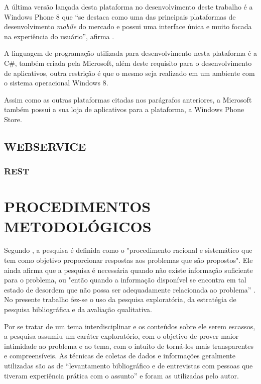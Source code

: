 \documentclass[
	12pt,				%
	openright,			%
	oneside,			%
	a4paper,			%
	chapter=TITLE,		%
	section=TITLE,		%
	english,			%
	french,				%
	spanish,			%
	brazil				%
	]{abntex2}
\begin{document}
A última versão lançada desta plataforma no desenvolvimento deste trabalho é a Windows Phone 8 que “se destaca como uma das principais plataformas de desenvolvimento \textit{mobile} do mercado e possui uma interface única e muito focada na experiência do usuário”, afirma . 

A linguagem de programação utilizada para desenvolvimento nesta plataforma é a C\#, também criada pela Microsoft, além deste requisito para o desenvolvimento de aplicativos, outra restrição é que o mesmo seja realizado em um ambiente com o sistema operacional Windows 8. 

Assim como as outras plataformas citadas nos parágrafos anteriores, a Microsoft também possui a sua loja de aplicativos para a plataforma, a Windows Phone Store.


\section{WEBSERVICE}

\subsection{REST}


\chapter{PROCEDIMENTOS METODOLÓGICOS}

Segundo , a pesquisa é definida como o "procedimento racional e sistemático que tem como objetivo proporcionar respostas aos problemas que são propostos". Ele ainda afirma que a pesquisa é necessária quando não existe informação suficiente para o problema, ou "então quando a informação disponível se encontra em tal estado de desordem que não possa ser adequadamente relacionada ao problema” \cite[p. 1]{gilPesquisa}. No presente trabalho fez-se o uso da pesquisa exploratória, da estratégia de pesquisa bibliográfica e da avaliação qualitativa.

Por se tratar de um tema interdisciplinar e os conteúdos sobre ele serem escassos, a pesquisa assumiu um caráter exploratório, com o objetivo de prover maior intimidade ao problema e ao tema, com o intuito de torná-los mais transparentes e compreensíveis. As técnicas de coletas de dados e informações geralmente utilizadas são as de “levantamento bibliográfico e de entrevistas com pessoas que tiveram experiência prática com o assunto” \cite[p. 27]{gilPesquisa} e foram as utilizadas pelo autor.
\end{document}
